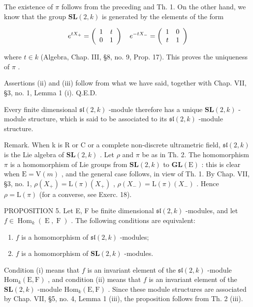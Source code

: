 The existence of \(\pi\) follows from the preceding and Th. 1. On the other hand, we know that the group \(\mathbf{SL}(2,k)\) is generated by the elements of the form

\[
e ^ {t X _ {+}} = \left( \begin{array}{c c} 1 & t \\ 0 & 1 \end{array} \right) \quad e ^ {- t X _ {-}} = \left( \begin{array}{c c} 1 & 0 \\ t & 1 \end{array} \right)
\]

where \(t \in k\) (Algebra, Chap. III, §8, no. 9, Prop. 17). This proves the uniqueness of \(\pi\) .

Assertions (ii) and (iii) follow from what we have said, together with Chap. VII, §3, no. 1, Lemma 1 (i). Q.E.D.

Every finite dimensional \(\mathfrak{sl}(2,k)\) -module therefore has a unique \(\mathbf{SL}(2,k)\) -module structure, which is said to be associated to its \(\mathfrak{sl}(2,k)\) -module structure.

Remark. When k is R or C or a complete non-discrete ultrametric field, \(\mathfrak{sl}(2,k)\) is the Lie algebra of \(\mathbf{SL}(2,k)\) . Let \(\rho\) and \(\pi\) be as in Th. 2. The homomorphism \(\pi\) is a homomorphism of Lie groups from \(\mathbf{SL}(2,k)\) to \(\mathbf{GL}(\mathrm{E})\) : this is clear when \(\mathrm{E} = \mathrm{V}(m)\) , and the general case follows, in view of Th. 1. By Chap. VII, §3, no. 1, \(\rho(X_{+}) = \mathrm{L}(\pi)(X_{+})\) , \(\rho(X_{-}) = \mathrm{L}(\pi)(X_{-})\) . Hence \(\rho = \mathrm{L}(\pi)\) (for a converse, see Exerc. 18).

PROPOSITION 5. Let E, F be finite dimensional \(\mathfrak{sl}(2,k)\) -modules, and let \(f \in \operatorname{Hom}_{k}(\operatorname{E},\operatorname{F})\) . The following conditions are equivalent:

\begin{enumerate}
\def\labelenumi{(\roman{enumi})}
\item
  \(f\) is a homomorphism of \(\mathfrak{sl}(2,k)\) -modules;
\item
  \(f\) is a homomorphism of \(\mathbf{SL}(2,k)\) -modules.
\end{enumerate}

Condition (i) means that \(f\) is an invariant element of the \(\mathfrak{sl}(2,k)\) -module \(\mathrm{Hom}_k(\mathrm{E},\mathrm{F})\) , and condition (ii) means that \(f\) is an invariant element of the \(\mathbf{SL}(2,k)\) -module \(\mathrm{Hom}_k(\mathrm{E},\mathrm{F})\) . Since these module structures are associated by Chap. VII, §5, no. 4, Lemma 1 (iii), the proposition follows from Th. 2 (iii).


